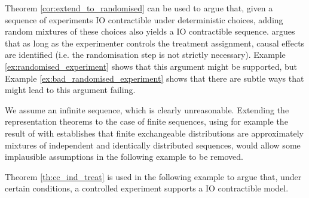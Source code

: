 Theorem \ref{cor:extend_to_randomised} can be used to argue that, given a sequence of experiments IO contractible under deterministic choices, adding random mixtures of these choices also yields a IO contractible sequence. \citet{kasy_why_2016} argues that as long as the experimenter controls the treatment assignment, causal effects are identified (i.e. the randomisation step is not strictly necessary). Example \ref{ex:randomised_experiment} shows that this argument might be supported, but Example \ref{ex:bad_randomised_experiment} shows that there are subtle ways that might lead to this argument failing.

We assume an infinite sequence, which is clearly unreasonable. Extending the representation theorems to the case of finite sequences, using for example the result of \citet{diaconis_finite_1980} with establishes that finite exchangeable distributions are approximately mixtures of independent and identically distributed sequences, would allow some implausible assumptions in the following example to be removed.

Theorem \ref{th:cc_ind_treat} is used in the following example to argue that, under certain conditions, a controlled experiment supports a IO contractible model.

